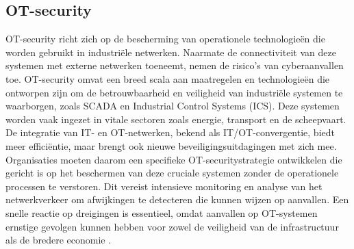 \subsection{OT-security}
OT-security richt zich op de bescherming van operationele technologieën die worden gebruikt in industriële netwerken. Naarmate de connectiviteit van deze systemen 
met externe netwerken toeneemt, nemen de risico’s van cyberaanvallen toe. OT-security omvat een breed scala aan maatregelen en technologieën die ontworpen zijn om 
de betrouwbaarheid en veiligheid van industriële systemen te waarborgen, zoals SCADA en Industrial Control Systems (ICS). Deze systemen worden vaak ingezet in vitale 
sectoren zoals energie, transport en de scheepvaart. De integratie van IT- en OT-netwerken, bekend als IT/OT-convergentie, biedt meer efficiëntie, maar brengt ook nieuwe 
beveiligingsuitdagingen met zich mee. Organisaties moeten daarom een specifieke OT-securitystrategie ontwikkelen die gericht is op het beschermen van deze cruciale systemen 
zonder de operationele processen te verstoren. Dit vereist intensieve monitoring en analyse van het netwerkverkeer om afwijkingen te detecteren die kunnen wijzen op aanvallen. 
Een snelle reactie op dreigingen is essentieel, omdat aanvallen op OT-systemen ernstige gevolgen kunnen hebben voor zowel de veiligheid van de infrastructuur als de bredere economie \autocite{Nomios2024}.



